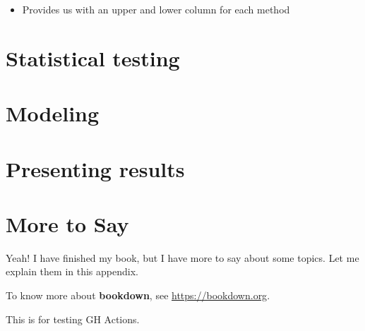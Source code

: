 \documentclass[
]{krantz}
\providecommand{\tightlist}{%
  \setlength{\itemsep}{0pt}\setlength{\parskip}{0pt}}
\begin{document}
\begin{itemize}
\tightlist
\item
  Provides us with an upper and lower column for each method
\end{itemize}

\hypertarget{c07}{%
\chapter{Statistical testing}\label{c07}}

\hypertarget{c08}{%
\chapter{Modeling}\label{c08}}

\hypertarget{c09}{%
\chapter{Presenting results}\label{c09}}

\cleardoublepage

\hypertarget{appendix-appendix}{%
\appendix {}}


\hypertarget{more-to-say}{%
\chapter{More to Say}\label{more-to-say}}

Yeah! I have finished my book, but I have more to say about some topics. Let me explain them in this appendix.

To know more about \textbf{bookdown}, see \url{https://bookdown.org}.

This is for testing GH Actions.

  

\backmatter
\printindex
\end{document}
